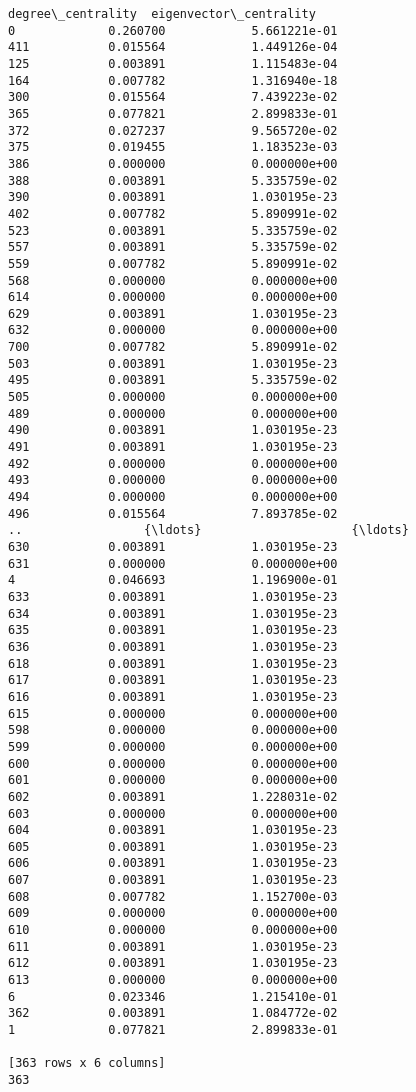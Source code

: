 \documentclass[11pt]{article}
\begin{document}
\begin{Verbatim}[commandchars=\\\{\}]
     degree\_centrality  eigenvector\_centrality  
0             0.260700            5.661221e-01  
411           0.015564            1.449126e-04  
125           0.003891            1.115483e-04  
164           0.007782            1.316940e-18  
300           0.015564            7.439223e-02  
365           0.077821            2.899833e-01  
372           0.027237            9.565720e-02  
375           0.019455            1.183523e-03  
386           0.000000            0.000000e+00  
388           0.003891            5.335759e-02  
390           0.003891            1.030195e-23  
402           0.007782            5.890991e-02  
523           0.003891            5.335759e-02  
557           0.003891            5.335759e-02  
559           0.007782            5.890991e-02  
568           0.000000            0.000000e+00  
614           0.000000            0.000000e+00  
629           0.003891            1.030195e-23  
632           0.000000            0.000000e+00  
700           0.007782            5.890991e-02  
503           0.003891            1.030195e-23  
495           0.003891            5.335759e-02  
505           0.000000            0.000000e+00  
489           0.000000            0.000000e+00  
490           0.003891            1.030195e-23  
491           0.003891            1.030195e-23  
492           0.000000            0.000000e+00  
493           0.000000            0.000000e+00  
494           0.000000            0.000000e+00  
496           0.015564            7.893785e-02  
..                 {\ldots}                     {\ldots}  
630           0.003891            1.030195e-23  
631           0.000000            0.000000e+00  
4             0.046693            1.196900e-01  
633           0.003891            1.030195e-23  
634           0.003891            1.030195e-23  
635           0.003891            1.030195e-23  
636           0.003891            1.030195e-23  
618           0.003891            1.030195e-23  
617           0.003891            1.030195e-23  
616           0.003891            1.030195e-23  
615           0.000000            0.000000e+00  
598           0.000000            0.000000e+00  
599           0.000000            0.000000e+00  
600           0.000000            0.000000e+00  
601           0.000000            0.000000e+00  
602           0.003891            1.228031e-02  
603           0.000000            0.000000e+00  
604           0.003891            1.030195e-23  
605           0.003891            1.030195e-23  
606           0.003891            1.030195e-23  
607           0.003891            1.030195e-23  
608           0.007782            1.152700e-03  
609           0.000000            0.000000e+00  
610           0.000000            0.000000e+00  
611           0.003891            1.030195e-23  
612           0.003891            1.030195e-23  
613           0.000000            0.000000e+00  
6             0.023346            1.215410e-01  
362           0.003891            1.084772e-02  
1             0.077821            2.899833e-01  

[363 rows x 6 columns]
363

    \end{Verbatim}
\end{document}
